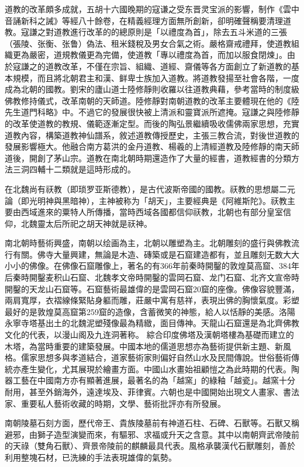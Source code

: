 道教的改革頗多成就，五胡十六國晚期的寇谦之受东晋灵宝派的影響，制作《雲中音誦新科之誡》等經八十餘卷，在精義經理方面無所創新，卻明確聲稱要清理道教。寇謙之對道教進行改革的的總原則是「以禮度為首」，除去五斗米道的三張（張陵、张衡、张鲁）偽法、租米錢稅及男女合氣之術。嚴格齋戒禮拜，使道教組織更為嚴密，道規教儀更為完備，使道教「專以禮度為首，而加以服食閉煉」。由於寇謙之的道教改革，不僅在宗旨、組織、道經、齋儀等各方面創立了新道教的基本規模，而且將北朝君主和漢、鲜卑士族加入道教。將道教發揚至社會各階，一度成為北朝的國教。劉宋的廬山道士陸修靜則收羅以往道教典藉，參考當時的制度級佛教修持儀式，改革南朝的天師道。陸修靜對南朝道教的改革主要體現在他的《陸先生道門科略》中。不過它的發展很快被上清派和靈寶派所遮掩。寇謙之與陸修靜的改革使道教的教規、儀範逐漸定型。而後的陶弘景繼續吸收儒佛兩家思想，充實道教內容，構築道教神仙譜系，敘述道教傳授歷史，主張三教合流，對後世道教的發展影響極大。他融合南方葛洪的金丹道教、楊羲的上清經道教及陸修靜的南天師道後，開創了茅山宗。道教在南北朝時期還造作了大量的經書，道教經書的分類方法三洞四輔十二類就是這時形成的。

在北魏尚有祆教（即琐罗亚斯德教），是古代波斯帝國的國教。祆教的思想屬二元論（即光明神與黑暗神），主神被称为「胡天」，主要經典是《阿維斯陀》。祆教主要由西域進來的粟特人所傳播，當時西域各國都信仰祆教，北朝也有部分皇室信仰，北魏靈太后所祀之胡天神就是祆神。

南北朝時藝術興盛，南朝以绘画為主，北朝以雕塑為主。北朝雕刻的盛行與佛教流行有關。佛寺大量興建，無論是木造、磚築或是石窟建造都有，並且雕刻无数大大小小的佛像。在佛像石窟雕像上，著名的有366年前秦時開鑿的敦煌莫高窟、384年后秦時開鑿麦积山石窟、北魏孝文帝時開鑿的雲岡石窟、龙门石窟、北齐文宣帝時開鑿的天龙山石窟等。石窟藝術最雄偉的是雲岡石窟20窟的座像。佛像容貌豐滿，兩肩寬厚，衣褶線條緊貼身軀而雕，莊嚴中寓有慈祥，表現出佛的胸懷氣度。彩塑最好的是敦煌莫高窟第259窟的造像，含蓄微笑的神態，給人以恬靜的美感。洛陽永寧寺塔基出土的北魏泥塑殘像最為精緻，面目傳神。天龍山石窟還是為北齊佛教文化的代表，以漫山阁及九连洞著称。 綜合印度佛塔及漢朝塔樓為基礎而建立的木塔，為當時重要的建築發展。中國本地的儒道思想亦為藝術提供新主題、新風格。儒家思想多與孝道結合，道家藝術家則偏好自然山水及民間傳說。世俗藝術傳統亦產生變化，尤其展現於繪畫方面。中國山水畫始祖顧愷之為此時期的代表。陶器工藝在中國南方亦有顯著進展，最著名的為「越窯」的綠釉「越瓷」。越窯十分耐用，甚至外銷海外，遠達埃及、菲律賓。六朝也是中國開始出現文人畫家、書法家、重要私人藝術收藏的時期，文學、藝術批評亦有所發展。

南朝陵墓石刻方面，歷代帝王、貴族陵墓前有神道石柱、石碑、石獸等。石獸又稱避邪，由獅子造型演變而來，有驅邪、求福或升天之含意。其中以南朝齊武帝陵前的天祿（雙角石獸）、齊景帝陵前的麒麟最具代表。風格承襲漢代石獸雕刻，善於利用整塊石材，已洗練的手法表現雄偉的氣勢。

